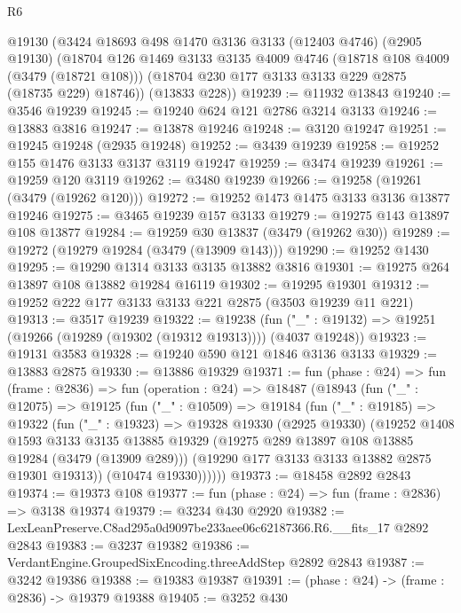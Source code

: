 \begin{lexlean}{R6}
\begin{coremodule}
    @19130
    (@3424
      @18693
      @498
      @1470
      @3136
      @3133
      (@12403 @4746)
      (@2905 @19130)
      (@18704
        @126
        @1469
        @3133
        @3135
        @4009
        @4746
        (@18718 @108 @4009 (@3479 (@18721 @108)))
        (@18704 @230 @177 @3133 @3133 @229 @2875 (@18735 @229) @18746))
      (@13833 @228))
@19239 := @11932 @13843
@19240 := @3546 @19239
@19245 := @19240 @624 @121 @2786 @3214 @3133
@19246 := @13883 @3816
@19247 := @13878 @19246
@19248 := @3120 @19247
@19251 := @19245 @19248 (@2935 @19248)
@19252 := @3439 @19239
@19258 := @19252 @155 @1476 @3133 @3137 @3119 @19247
@19259 := @3474 @19239
@19261 := @19259 @120 @3119
@19262 := @3480 @19239
@19266 := @19258 (@19261 (@3479 (@19262 @120)))
@19272 := @19252 @1473 @1475 @3133 @3136 @13877 @19246
@19275 := @3465 @19239 @157 @3133
@19279 := @19275 @143 @13897 @108 @13877
@19284 := @19259 @30 @13837 (@3479 (@19262 @30))
@19289 := @19272 (@19279 @19284 (@3479 (@13909 @143)))
@19290 := @19252 @1430
@19295 := @19290 @1314 @3133 @3135 @13882 @3816
@19301 := @19275 @264 @13897 @108 @13882 @19284 @16119
@19302 := @19295 @19301
@19312 := @19252 @222 @177 @3133 @3133 @221 @2875 (@3503 @19239 @11 @221)
@19313 := @3517 @19239
@19322 := @19238
    (fun ("_" : @19132) => @19251 (@19266 (@19289 (@19302 (@19312 @19313)))) (@4037 @19248))
@19323 := @19131 @3583
@19328 := @19240 @590 @121 @1846 @3136 @3133
@19329 := @13883 @2875
@19330 := @13886 @19329
@19371 := fun (phase : @24) =>
  fun (frame : @2836) =>
  fun (operation : @24) =>
  @18487
    (@18943
      (fun ("_" : @12075) =>
      @19125
        (fun ("_" : @10509) =>
        @19184
          (fun ("_" : @19185) =>
          @19322
            (fun ("_" : @19323) =>
            @19328
              @19330
              (@2925 @19330)
              (@19252
                @1408
                @1593
                @3133
                @3135
                @13885
                @19329
                (@19275 @289 @13897 @108 @13885 @19284 (@3479 (@13909 @289)))
                (@19290 @177 @3133 @3133 @13882 @2875 @19301 @19313))
              (@10474 @19330))))))
@19373 := @18458 @2892 @2843
@19374 := @19373 @108
@19377 := fun (phase : @24) => fun (frame : @2836) => @3138 @19374
@19379 := @3234 @430 @2920
@19382 := LexLeanPreserve.C8ad295a0d9097be233aee06c62187366.R6.__fits_17 @2892 @2843
@19383 := @3237 @19382
@19386 := VerdantEngine.GroupedSixEncoding.threeAddStep @2892 @2843
@19387 := @3242 @19386
@19388 := @19383 @19387
@19391 := (phase : @24) -> (frame : @2836) -> @19379 @19388
@19405 := @3252
    @430

\end{coremodule}
\end{lexlean}
